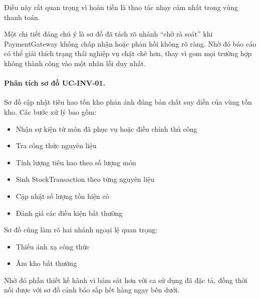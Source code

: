 Điều này rất quan trọng vì hoàn tiền là thao tác nhạy cảm nhất trong vùng thanh toán.

Một chi tiết đáng chú ý là sơ đồ đã tách rõ nhánh \enquote{chờ rà soát} khi \textsf{PaymentGateway} không chấp nhận hoặc phản hồi không rõ ràng. Nhờ đó báo cáo có thể giải thích trạng thái nghiệp vụ chặt chẽ hơn, thay vì gom mọi trường hợp không thành công vào một nhãn lỗi duy nhất.


\paragraph{Phân tích sơ đồ UC-INV-01.}
Sơ đồ cập nhật tiêu hao tồn kho phản ánh đúng bản chất suy diễn của vùng tồn kho. Các bước xử lý bao gồm:

\begin{itemize}
    \item Nhận sự kiện từ món đã phục vụ hoặc điều chỉnh thủ công
    \item Tra công thức nguyên liệu
    \item Tính lượng tiêu hao theo số lượng món
    \item Sinh \textsf{StockTransaction} theo từng nguyên liệu
    \item Cập nhật số lượng tồn hiện có
    \item Đánh giá các điều kiện bất thường
\end{itemize}

Sơ đồ cũng làm rõ hai nhánh ngoại lệ quan trọng:

\begin{itemize}
    \item Thiếu ánh xạ công thức
    \item Âm kho bất thường
\end{itemize}

Nhờ đó phần thiết kế hành vi bám sát hơn với ca sử dụng đã đặc tả, đồng thời nối được với sơ đồ cảnh báo sắp hết hàng ngay bên dưới.


